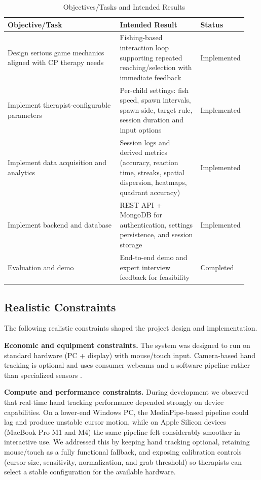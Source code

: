 \documentclass[12pt]{article}
\begin{document}
\begin{table}[H]
\centering
\caption{Objectives/Tasks and Intended Results}
\label{tab:objectives}
\begin{tabular}{p{0.48\linewidth} p{0.34\linewidth} p{0.12\linewidth}}
\toprule
\textbf{Objective/Task} & \textbf{Intended Result} & \textbf{Status} \\
\midrule
Design serious game mechanics aligned with CP therapy needs & Fishing-based interaction loop supporting repeated reaching/selection with immediate feedback & Implemented \\
Implement therapist-configurable parameters & Per-child settings: fish speed, spawn intervals, spawn side, target rule, session duration and input options & Implemented \\
Implement data acquisition and analytics & Session logs and derived metrics (accuracy, reaction time, streaks, spatial dispersion, heatmaps, quadrant accuracy) & Implemented \\
Implement backend and database & REST API + MongoDB for authentication, settings persistence, and session storage & Implemented \\
Evaluation and demo & End-to-end demo and expert interview feedback for feasibility & Completed \\
\bottomrule
\end{tabular}
\end{table}

\subsection{Realistic Constraints}
The following realistic constraints shaped the project design and implementation.

\textbf{Economic and equipment constraints.} The system was designed to run on standard hardware (PC + display) with mouse/touch input. Camera-based hand tracking is optional and uses consumer webcams and a software pipeline rather than specialized sensors \cite{ref7}.

\textbf{Compute and performance constraints.} During development we observed that real-time hand tracking performance depended strongly on device capabilities. On a lower-end Windows PC, the MediaPipe-based pipeline could lag and produce unstable cursor motion, while on Apple Silicon devices (MacBook Pro M1 and M4) the same pipeline felt considerably smoother in interactive use. We addressed this by keeping hand tracking optional, retaining mouse/touch as a fully functional fallback, and exposing calibration controls (cursor size, sensitivity, normalization, and grab threshold) so therapists can select a stable configuration for the available hardware.
\end{document}
